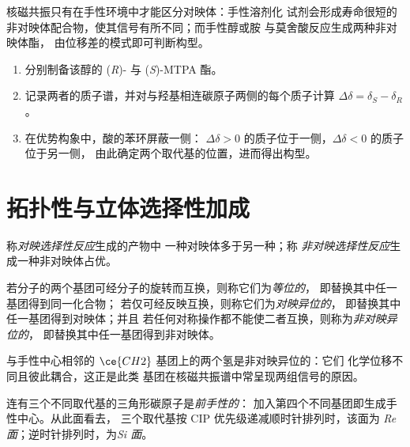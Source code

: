 核磁共振只有在手性环境中才能区分对映体：手性溶剂化
试剂会形成寿命很短的非对映体配合物，使其信号有所不同；而手性醇或胺
与莫舍酸反应生成两种非对映体酯，
由位移差的模式即可判断构型。

\begin{method}[由莫舍酯判断构型（概要）]\label{met:b3:asymmetric-synthesis:mosher}
\begin{enumerate}
  \item 分别制备该醇的 (\textit{R})- 与 (\textit{S})-MTPA 酯。
  \item 记录两者的质子谱，并对与羟基相连碳原子两侧的每个质子计算
        $\Delta\delta = \delta_S - \delta_R$。
  \item 在优势构象中，酸的苯环屏蔽一侧：
        $\Delta\delta > 0$ 的质子位于一侧，$\Delta\delta < 0$ 的质子位于另一侧，
        由此确定两个取代基的位置，进而得出构型。
\end{enumerate}
\end{method}

\section{拓扑性与立体选择性加成}

\begin{definition}[立体选择性反应]\label{def:b3:asymmetric-synthesis:selective}
称\emph{对映选择性反应}生成的产物中
一种对映体多于另一种；称
\emph{非对映选择性反应}生成一种非对映体占优。
\end{definition}

\begin{definition}[拓扑性]\label{def:b3:asymmetric-synthesis:topicity}
若分子的两个基团可经分子的旋转而互换，则称它们为\emph{等位的}，
即替换其中任一基团得到同一化合物；
若仅可经反映互换，则称它们为\emph{对映异位的}，
即替换其中任一基团得到对映体；并且
若任何对称操作都不能使二者互换，则称为\emph{非对映异位的}，
即替换其中任一基团得到非对映体。
\end{definition}

与手性中心相邻的 $\ce{CH2}$ 基团上的两个氢是非对映异位的：它们
化学位移不同且彼此耦合，这正是此类
基团在核磁共振谱中常呈现两组信号的原因。

\begin{definition}[前手性面]\label{def:b3:asymmetric-synthesis:faces}
连有三个不同取代基的三角形碳原子是\emph{前手性的}：
加入第四个不同基团即生成手性中心。从此面看去，
三个取代基按 CIP 优先级递减顺时针排列时，该面为
\emph{Re 面}；逆时针排列时，为\emph{Si 面}。
\end{definition}

